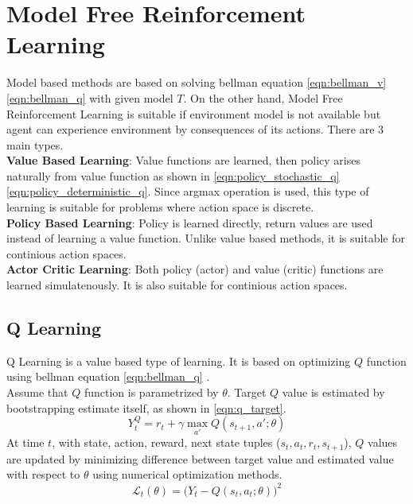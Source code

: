 \section{Model Free Reinforcement Learning}
\label{sec:mf_rl}
Model based methods are based on solving bellman equation \ref{eqn:bellman_v}\ref{eqn:bellman_q} with given model $T$. On the other hand, Model Free Reinforcement Learning is suitable if environment model is not available but agent can experience environment by consequences of its actions. There are 3 main types. \\
\textbf{Value Based Learning}: Value functions are learned, then policy arises naturally from value function as shown in \ref{eqn:policy_stochastic_q} \ref{eqn:policy_deterministic_q}. Since argmax operation is used, this type of learning is suitable for problems where action space is discrete. \\
\textbf{Policy Based Learning}: Policy is learned directly, return values are used instead of learning a value function. Unlike value based methods, it is suitable for continious action spaces. \\
\textbf{Actor Critic Learning}: Both policy (actor) and value (critic) functions are learned simulatenously. It is also suitable for continious action spaces. \\
\subsection{Q Learning}
Q Learning is a value based type of learning. It is based on optimizing $Q$ function using bellman equation \ref{eqn:bellman_q} \cite{watkins_technical_1992}. \\ 
Assume that $Q$ function is parametrized by $\theta$. Target $Q$ value is estimated by bootstrapping estimate itself, as shown in  \eqref{eqn:q_target}. \\
%
\begin{equation}
\label{eqn:q_target}
Y_t^Q = r_t + \gamma \max_{a'} Q(s_{t+1},a';\theta)
\end{equation}
At time $t$,  with state, action, reward, next state tuples ($s_t,a_t,r_t,s_{t+1}$), $Q$ values are updated by minimizing difference between target value and estimated value with respect to $\theta$ using numerical optimization methods. \\
\begin{equation}
\label{eqn:q_loss}
\mathcal{L}_t(\theta) = \big( Y_t - Q(s_t,a_t;\theta) \big) ^ 2
\end{equation}
%
